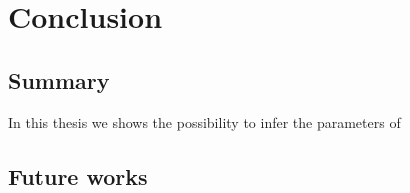 \chapter{Conclusion}
\section{Summary}
In this thesis we shows the possibility to infer the parameters of 

\section{Future works}